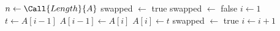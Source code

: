\begin{algorithmic}
        \State $n \gets \Call{Length}{A}$
        \State swapped $\gets$ true
            \State swapped $\gets$ false
            \State $i \gets 1$
                    \State $t \gets A[i-1]$
                    \State $A[i-1] \gets A[i]$
                    \State $A[i] \gets t$
                    \State swapped $\gets$ true
                \EndIf
                \State $i \gets i+1$
            \EndWhile
        \EndWhile
    \EndFunction
\end{algorithmic}
